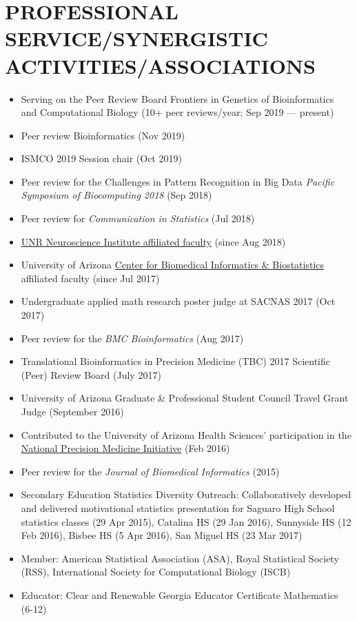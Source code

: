 \documentclass[paper=a4,fontsize=11pt]{scrartcl} %
\newcommand{\NewPart}[2]{\section*{\uppercase{#1} #2 }}
\begin{document}
\NewPart{Professional Service/Synergistic Activities/Associations}{}
\vspace{-7pt}
\begin{itemize}[noitemsep]
      \item Serving on the Peer Review Board Frontiers in Genetics of Bioinformatics and Computational Biology (10+ peer reviews/year; Sep 2019 --- present)
    \item Peer review Bioinformatics (Nov 2019)
  \item ISMCO 2019 Session chair (Oct 2019)
  \item Peer review for the Challenges in Pattern Recognition in Big Data \emph{Pacific Symposium of Biocomputing 2018} (Sep 2018)
  \item Peer review for \emph{Communication in Statistics} (Jul 2018)
\item \href{https://www.unr.edu/neuroscience/people}{UNR Neuroscience Institute affiliated faculty} (since Aug 2018)
  \item University of Arizona \href{http://cb2.uahs.arizona.edu/}{Center for Biomedical Informatics \& Biostatistics} affiliated faculty (since Jul 2017)
\item Undergraduate applied math research poster judge at SACNAS 2017 (Oct 2017)
\item Peer review for the \emph{BMC Bioinformatics} (Aug 2017)
\item Translational Bioinformatics in Precision Medicine (TBC) 2017 Scientific (Peer) Review Board (July 2017)
\item University of Arizona Graduate \& Professional Student Council Travel Grant Judge (September 2016)
\item Contributed to the University of Arizona Health Sciences' participation in the   \href{https://www.nih.gov/precision-medicine-initiative-cohort-program}{National Precision Medicine Initiative\circledR}  \hspace{3pt}(Feb 2016)
  \item Peer review for the \emph{Journal of Biomedical Informatics} (2015)
\item Secondary Education Statistics Diversity Outreach: Collaboratively developed and delivered motivational statistics presentation for Saguaro High School statistics classes (29 Apr 2015), Catalina HS (29 Jan 2016), Sunnyside HS (12 Feb 2016), Bisbee HS (5 Apr 2016), San Miguel HS (23 Mar 2017)
\item Member: American Statistical Association (ASA), Royal Statistical Society (RSS), International Society for Computational Biology (ISCB)
\item Educator: Clear and Renewable Georgia Educator Certificate Mathematics (6-12)
\vspace{-7pt}
\end{itemize}
\end{document}
